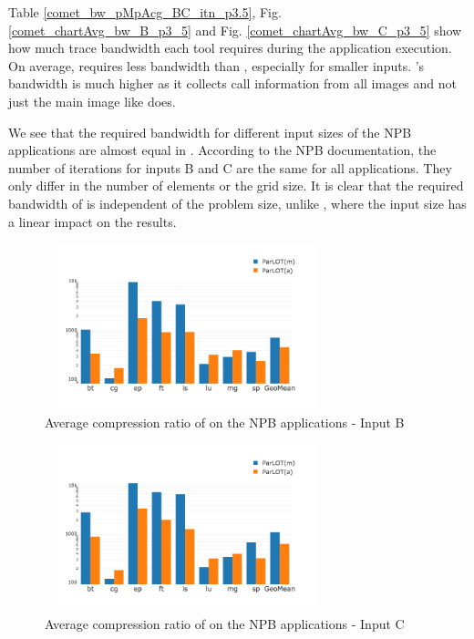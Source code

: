 Table \ref{comet_bw_pMpAcg_BC_itn_p3.5}, Fig.  \ref{comet_chartAvg_bw_B_p3_5} and Fig. \ref{comet_chartAvg_bw_C_p3_5} show how much trace bandwidth each tool 
requires
during the application execution. 
%
On average, \parlotm requires less bandwidth than
\callgrind, especially for smaller inputs. 
%
\parlota's bandwidth is much higher as it collects call information from all
images and not just the main image like \parlotm does.

We see that the required bandwidth for different input sizes of the NPB applications are almost equal in \parlot. According to the NPB documentation, the number of iterations for inputs B and C are the same for all applications. They only differ in the number of elements or the grid size. It is clear that the required bandwidth of \parlot is independent of the problem size, unlike \callgrind, where the input size has a linear impact on the results.

%
\begin{figure}[t]
\centering
\includegraphics[width=3.2in,height=1.9in]{figs.comet.newMed/comet_chartAvg_cr_B_p3_5.png}
\caption{ Average compression ratio of \parlot on the NPB applications - Input B}
\label{comet_chartAvg_cr_B_p3_5}
\end{figure}

\begin{figure}[t]
\centering
\includegraphics[width=3.2in,height=1.9in]{figs.comet.newMed/comet_chartAvg_cr_C_p3_5.png}
\caption{ Average compression ratio of \parlot on the NPB applications - Input C}
\label{comet_chartAvg_cr_C_p3_5}
\end{figure}



